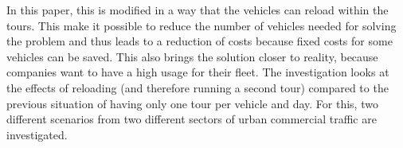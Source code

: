 In this paper, this is modified in a way that the vehicles can reload within the tours. This make it possible to reduce the number of vehicles needed for solving the problem and thus leads to a reduction of costs because fixed costs for some vehicles can be saved. This also brings the solution closer to reality, because companies want to have a high usage for their fleet. The investigation looks at the effects of reloading (and therefore running a second tour) compared to the previous situation of having only one tour per vehicle and day. For this, two different scenarios from two different sectors of urban commercial traffic are investigated.

%
